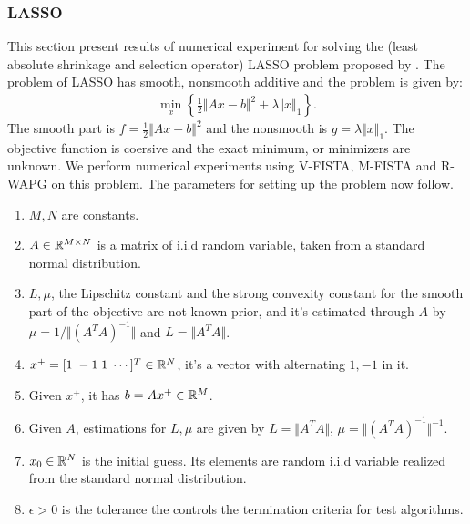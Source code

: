 \documentclass[12pt]{article}
\begin{document}
        \subsubsection{LASSO}
            This section present results of numerical experiment for solving the (least absolute shrinkage and
            selection operator) LASSO problem proposed by 
             \cite{tibshirani_regression_1996}. 
            The problem of LASSO has smooth, nonsmooth additive and the problem is given by: 
            \begin{align*}
                \min_x
                \left\lbrace
                    \frac{1}{2}\Vert Ax - b\Vert^2 + \lambda\Vert x\Vert_1
                \right\rbrace. 
            \end{align*}
            The smooth part is $f =\frac{1}{2}\Vert Ax - b\Vert^2$ and the nonsmooth is $g = \lambda\Vert x\Vert_1$. 
            The objective function is coersive and the exact minimum, or minimizers are unknown. 
            We perform numerical experiments using V-FISTA, M-FISTA and R-WAPG on this problem. 
            The parameters for setting up the problem now follow. 
            \begin{enumerate}
                \item $M, N$ are constants. 
                \item $A \in \mathbb R^{M\times N}$ is a matrix of i.i.d random variable, taken from a standard normal distribution. 
                \item $L, \mu$, the Lipschitz constant and the strong convexity constant for the smooth part of the objective are not known prior, and it's estimated through $A$ by $\mu = 1/\Vert (A^TA)^{-1}\Vert$ and $L = \Vert A^TA\Vert$. 
                \item $x^+ = [1\; -1\; 1 \; \cdots ]^T \in \mathbb R^N$, it's a vector with alternating $1, -1$ in it. 
                \item Given $x^+$, it has $b = Ax^+ \in \mathbb R^M$. 
                \item Given $A$, estimations for $L,\mu$ are given by $L = \Vert A^TA\Vert$, $\mu = \Vert (A^TA)^{-1}\Vert^{-1}$. 
                \item $x_0\in \mathbb R^N$ is the initial guess. Its elements are random i.i.d variable realized from the standard normal distribution. 
                \item $\epsilon > 0$ is the tolerance the controls the termination criteria for test algorithms. 
            \end{enumerate}
\end{document}

